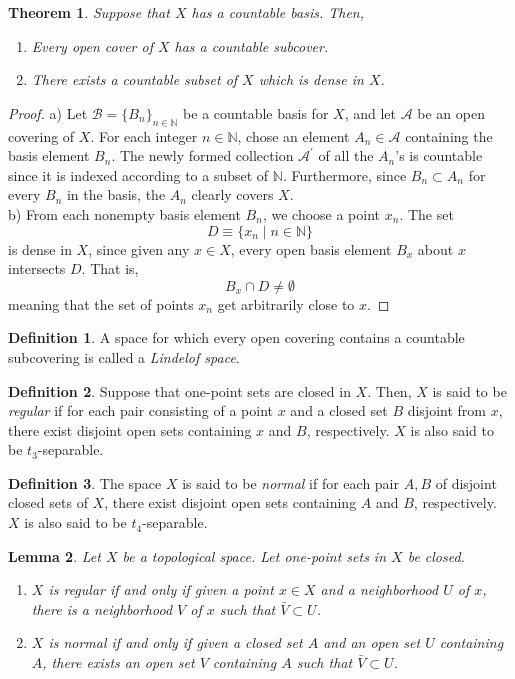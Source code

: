 \documentclass{article}
\newtheorem{theorem}{Theorem}[section]
\newtheorem{lemma}[theorem]{Lemma}
\theoremstyle{remark}
\theoremstyle{definition}
\newtheorem{definition}{Definition}[section]
\begin{document}
\begin{theorem}
Suppose that $X$ has a countable basis. Then, 
\begin{enumerate}
    \item Every open cover of $X$ has a countable subcover. 
    \item There exists a countable subset of $X$ which is dense in $X$. 
\end{enumerate}
\end{theorem}
\begin{proof}
a) Let $\mathscr{B} = \{B_n\}_{n \in \mathbb{N}}$ be a countable basis for $X$, and let $\mathscr{A}$ be an open covering of $X$. For each integer $n \in \mathbb{N}$, chose an element $A_n \in \mathscr{A}$ containing the basis element $B_n$. The newly formed collection $\mathscr{A}^\prime$ of all the $A_n$'s is countable since it is indexed according to a subset of $\mathbb{N}$. Furthermore, since $B_n \subset A_n$ for every $B_n$ in the basis, the $A_n$ clearly covers $X$. \\
b) From each nonempty basis element $B_n$, we choose a point $x_n$. The set 
\[D \equiv \{x_n \; | \; n \in \mathbb{N}\}\]
is dense in $X$, since given any $x \in X$, every open basis element $B_x$ about $x$ intersects $D$. That is, 
\[B_x \cap D \neq \emptyset\]
meaning that the set of points $x_n$ get arbitrarily close to $x$. 
\end{proof}

\begin{definition}
A space for which every open covering contains a countable subcovering is called a \textit{Lindelof space}. 
\end{definition}

\begin{definition}
Suppose that one-point sets are closed in $X$. Then, $X$ is said to be \textit{regular} if for each pair consisting of a point $x$ and a closed set $B$ disjoint from $x$, there exist disjoint open sets containing $x$ and $B$, respectively. $X$ is also said to be $t_3$-separable. 
\end{definition}

\begin{definition}
The space $X$ is said to be \textit{normal} if for each pair $A, B$ of disjoint closed sets of $X$, there exist disjoint open sets containing $A$ and $B$, respectively. $X$ is also said to be $t_4$-separable. 
\end{definition}

\begin{lemma}
Let $X$ be a topological space. Let one-point sets in $X$ be closed. 
\begin{enumerate}
    \item $X$ is regular if and only if given a point $x \in X$ and a neighborhood $U$ of $x$, there is a neighborhood $V$ of $x$ such that $\bar{V} \subset U$. 
    \item $X$ is normal if and only if given a closed set $A$ and an open set $U$ containing $A$, there exists an open set $V$ containing $A$ such that $\bar{V} \subset U$. 
\end{enumerate}
\end{lemma}
\end{document}
